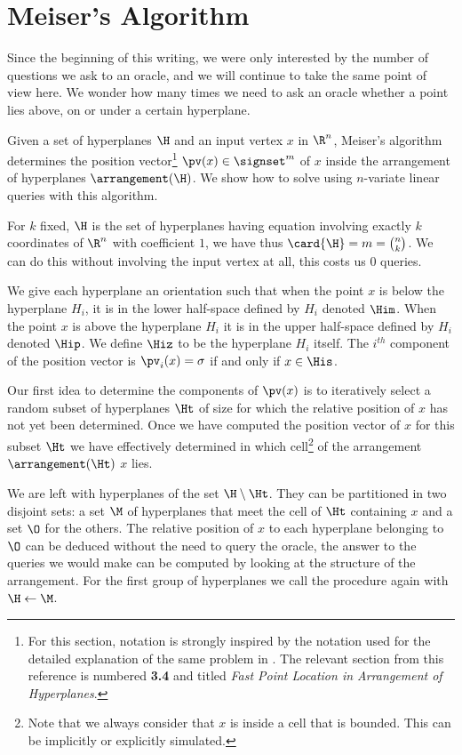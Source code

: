 \section{Meiser's Algorithm}

Since the beginning of this writing, we were only interested by the number of
questions we ask to an oracle, and we will continue to take the same point of
view here. We wonder how many times we need to ask an oracle whether a point
lies above, on or under a certain hyperplane.

Given a set of hyperplanes \(\H\) and an input vertex \(x\) in \(\R^n\),
Meiser's algorithm \cite{meiser:1993} determines the position vector\footnote{
For this section, notation is strongly inspired by the notation
used for the detailed explanation of the same problem in \citet*{burgisser:1997}.
The relevant section from this reference is numbered \textbf{3.4} and titled
\emph{Fast Point Location in Arrangement of Hyperplanes}.
}
$\pv(x) \in
\signset^{m}$ of $x$ inside the
arrangement of hyperplanes $\arrangement(\H)$.
We show how to solve \kSUM using  $n$-variate
linear queries with this algorithm.

For \(k\) fixed,
\(\H\) is the set of hyperplanes having equation involving exactly $k$
coordinates of $\R^n$ with coefficient $1$, we have thus $\card{\H} = m =
\binom{n}{k}$. We can do this without involving the input vertex at all, this
costs us $0$ queries.

We give each hyperplane an orientation such that when the point $x$ is below
the
hyperplane $H_i$, it is in the lower half-space defined by $H_i$ denoted
$\Him$. When the point $x$ is above the hyperplane $H_i$ it is in the upper
half-space defined by $H_i$ denoted $\Hip$. We define $\Hiz$ to be the
hyperplane $H_i$ itself. The $i^{th}$ component of the position vector is
$\pv_i(x) = \sigma$ if and only if $x \in \His$.

Our first idea to determine the components of $\pv(x)$ is to iteratively
select a random subset of hyperplanes \(\Ht\) of size 
for which the relative position of $x$ has not yet been
determined. Once we have
computed the position vector of \(x\) for this subset \(\Ht\)
we have effectively determined in
which cell\footnote{Note that we always consider that \(x\) is inside a cell that is bounded.
This can be implicitly or explicitly simulated.}
of the arrangement $\arrangement(\Ht)$ $x$ lies.

We are left with hyperplanes of the set $\H \setminus \Ht$. They can be
partitioned in two disjoint sets: a set $\M$ of hyperplanes that meet the cell of
$\Ht$ containing $x$ and a set $\O$ for the others. The relative position of $x$
to each hyperplane belonging to $\O$ can be deduced without the need to query
the oracle, the answer to the queries we would make can be computed by looking
at the structure of the arrangement. For the first group of hyperplanes
we call the procedure again with $\H \gets \M$.

